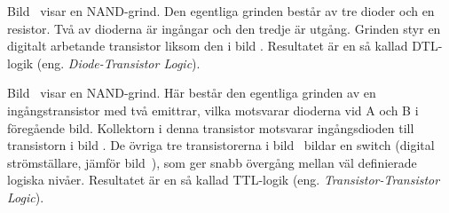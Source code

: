 
Bild~ visar en NAND-grind.
Den egentliga grinden består av tre dioder och en resistor.
Två av dioderna är ingångar och den tredje är utgång.
Grinden styr en digitalt arbetande transistor liksom den i bild
.
Resultatet är en så kallad DTL-logik (eng. \emph{Diode-Transistor Logic}).


Bild~ visar en NAND-grind.
Här består den egentliga grinden av en ingångstransistor med två emittrar,
vilka motsvarar dioderna vid A och B i föregående bild.
Kollektorn i denna transistor motsvarar ingångsdioden till transistorn i bild
.
De övriga tre transistorerna i bild~ bildar en switch
(digital strömställare, jämför bild~), som ger snabb
övergång mellan väl definierade logiska nivåer.
Resultatet är en så kallad TTL-logik (eng. \emph{Transistor-Transistor Logic}).
